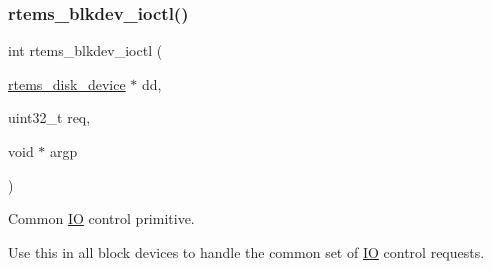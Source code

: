 \subsubsection{\texorpdfstring{rtems\_blkdev\_ioctl()}{rtems\_blkdev\_ioctl()}}
{\footnotesize\ttfamily int rtems\+\_\+blkdev\+\_\+ioctl (\begin{DoxyParamCaption}\item[{\mbox{\hyperlink{structrtems__disk__device}{rtems\+\_\+disk\+\_\+device}} $\ast$}]{dd,  }\item[{uint32\+\_\+t}]{req,  }\item[{void $\ast$}]{argp }\end{DoxyParamCaption})}



Common \mbox{\hyperlink{structIO}{IO}} control primitive. 

Use this in all block devices to handle the common set of \mbox{\hyperlink{structIO}{IO}} control requests. 